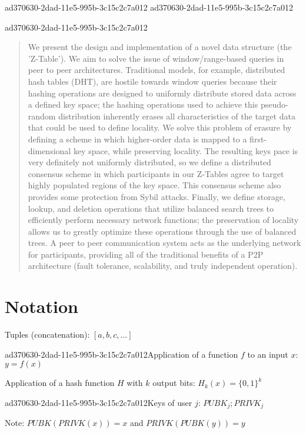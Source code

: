 \documentclass[12pt]{article}
\begin{document}
ad370630-2dad-11e5-995b-3c15c2c7a012
ad370630-2dad-11e5-995b-3c15c2c7a012\maketitle
ad370630-2dad-11e5-995b-3c15c2c7a012
\begin{abstract}
We present the design and implementation of a novel data structure (the 'Z-Table'). We aim to solve the issue of window/range-based queries in peer to peer architectures. Traditional models, for example,  distributed hash tables (DHT), are hostile towards window queries because their hashing operations are designed to uniformly distribute stored data across a defined key space; the hashing operations used to achieve this pseudo-random distribution inherently erases all characteristics of the target data that could be used to define locality. We solve this problem of erasure by defining a scheme in which higher-order data is mapped to a first-dimensional key space, while preserving locality. The resulting keys pace is very definitely not uniformly distributed, so we define a distributed consensus scheme in which participants in our Z-Tables agree to target highly populated regions of the key space. This consensus scheme also provides some protection from Sybil attacks. Finally, we define storage, lookup, and deletion operations that utilize balanced search trees to efficiently perform necessary network functions; the preservation of locality allows us to greatly optimize these operations through the use of balanced trees. A peer to peer communication system acts as the underlying network for participants, providing all of the traditional benefits of a P2P architecture (fault tolerance, scalability, and truly independent operation).
\end{abstract}

\section{Notation}

Tuples (concatenation): $[a,b,c,...]$

ad370630-2dad-11e5-995b-3c15c2c7a012Application of a function $f$ to an input $x$: $y=f(x)$

Application of a hash function $H$ with $k$ output bits: $H_{k}(x) = \{0,1\}^k$

ad370630-2dad-11e5-995b-3c15c2c7a012Keys of user $j$: $ PUBK_j; PRIVK_j $

Note: $PUBK(PRIVK(x)) = x$ and $PRIVK(PUBK(y)) = y$~
\end{document}
